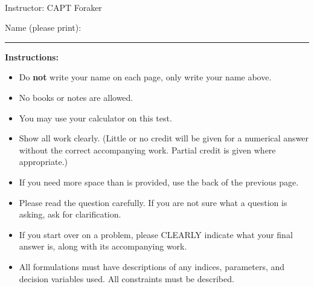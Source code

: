 \documentclass[12pt]{article}
\begin{document}


\newpage

 \pagestyle{empty}



\noindent



 \\

\smskip

\noindent
{\sc Instructor: CAPT Foraker}

\vspace{1.0cm}
\noindent
Name (please print): \ \ \rule{6cm}{.1mm}  \quad  
\vspace{1cm}


\noindent
{\bf Instructions:}
\\
\begin{itemize}
\item Do {\bf not} write your name on each page, only write your name above.

\item No books or notes %
 are allowed. %

\item You may use your calculator on this test.

\item Show all work clearly. (Little or no credit will be given for a numerical
answer without the correct accompanying work.
Partial credit is given where appropriate.) 

\item If you need more space than is provided, use the back of the previous page. 

\item Please read the question carefully.
If you are not sure what a question is
asking, ask for clarification.

\item If you start over on a problem, please CLEARLY indicate what your final
  answer is, along with its accompanying work.

\item All formulations must have descriptions of any indices, parameters, and decision variables used. All constraints must be described. 
\end{itemize}
\end{document}
